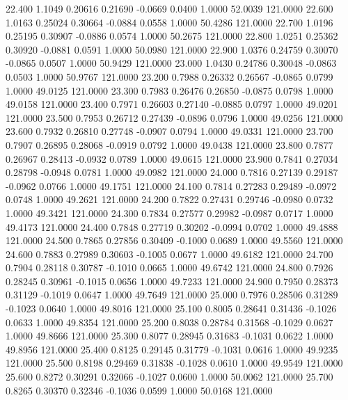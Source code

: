   22.400   1.1049   0.20616   0.21690  -0.0669   0.0400   1.0000  52.0039 121.0000
  22.600   1.0163   0.25024   0.30664  -0.0884   0.0558   1.0000  50.4286 121.0000
  22.700   1.0196   0.25195   0.30907  -0.0886   0.0574   1.0000  50.2675 121.0000
  22.800   1.0251   0.25362   0.30920  -0.0881   0.0591   1.0000  50.0980 121.0000
  22.900   1.0376   0.24759   0.30070  -0.0865   0.0507   1.0000  50.9429 121.0000
  23.000   1.0430   0.24786   0.30048  -0.0863   0.0503   1.0000  50.9767 121.0000
  23.200   0.7988   0.26332   0.26567  -0.0865   0.0799   1.0000  49.0125 121.0000
  23.300   0.7983   0.26476   0.26850  -0.0875   0.0798   1.0000  49.0158 121.0000
  23.400   0.7971   0.26603   0.27140  -0.0885   0.0797   1.0000  49.0201 121.0000
  23.500   0.7953   0.26712   0.27439  -0.0896   0.0796   1.0000  49.0256 121.0000
  23.600   0.7932   0.26810   0.27748  -0.0907   0.0794   1.0000  49.0331 121.0000
  23.700   0.7907   0.26895   0.28068  -0.0919   0.0792   1.0000  49.0438 121.0000
  23.800   0.7877   0.26967   0.28413  -0.0932   0.0789   1.0000  49.0615 121.0000
  23.900   0.7841   0.27034   0.28798  -0.0948   0.0781   1.0000  49.0982 121.0000
  24.000   0.7816   0.27139   0.29187  -0.0962   0.0766   1.0000  49.1751 121.0000
  24.100   0.7814   0.27283   0.29489  -0.0972   0.0748   1.0000  49.2621 121.0000
  24.200   0.7822   0.27431   0.29746  -0.0980   0.0732   1.0000  49.3421 121.0000
  24.300   0.7834   0.27577   0.29982  -0.0987   0.0717   1.0000  49.4173 121.0000
  24.400   0.7848   0.27719   0.30202  -0.0994   0.0702   1.0000  49.4888 121.0000
  24.500   0.7865   0.27856   0.30409  -0.1000   0.0689   1.0000  49.5560 121.0000
  24.600   0.7883   0.27989   0.30603  -0.1005   0.0677   1.0000  49.6182 121.0000
  24.700   0.7904   0.28118   0.30787  -0.1010   0.0665   1.0000  49.6742 121.0000
  24.800   0.7926   0.28245   0.30961  -0.1015   0.0656   1.0000  49.7233 121.0000
  24.900   0.7950   0.28373   0.31129  -0.1019   0.0647   1.0000  49.7649 121.0000
  25.000   0.7976   0.28506   0.31289  -0.1023   0.0640   1.0000  49.8016 121.0000
  25.100   0.8005   0.28641   0.31436  -0.1026   0.0633   1.0000  49.8354 121.0000
  25.200   0.8038   0.28784   0.31568  -0.1029   0.0627   1.0000  49.8666 121.0000
  25.300   0.8077   0.28945   0.31683  -0.1031   0.0622   1.0000  49.8956 121.0000
  25.400   0.8125   0.29145   0.31779  -0.1031   0.0616   1.0000  49.9235 121.0000
  25.500   0.8198   0.29469   0.31838  -0.1028   0.0610   1.0000  49.9549 121.0000
  25.600   0.8272   0.30291   0.32066  -0.1027   0.0600   1.0000  50.0062 121.0000
  25.700   0.8265   0.30370   0.32346  -0.1036   0.0599   1.0000  50.0168 121.0000
